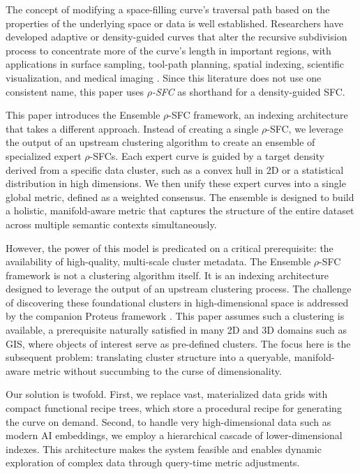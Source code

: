 \documentclass[11pt]{article}
\begin{document}
The concept of modifying a space-filling curve's traversal path based on the properties of the underlying space or data is well established. Researchers have developed adaptive or density-guided curves that alter the recursive subdivision process to concentrate more of the curve's length in important regions, with applications in surface sampling, tool-path planning, spatial indexing, scientific visualization, and medical imaging \cite{quinn2006adaptive,sun2015toolpath,tian2013density,zhou2021data,sakoglu2020space}. Since this literature does not use one consistent name, this paper uses \emph{$\rho$-SFC} as shorthand for a density-guided SFC.

This paper introduces the Ensemble $\rho$-SFC framework, an indexing architecture that takes a different approach. Instead of creating a single $\rho$-SFC, we leverage the output of an upstream clustering algorithm to create an ensemble of specialized expert $\rho$-SFCs. Each expert curve is guided by a target density derived from a specific data cluster, such as a convex hull in 2D or a statistical distribution in high dimensions. We then unify these expert curves into a single global metric, defined as a weighted consensus. The ensemble is designed to build a holistic, manifold-aware metric that captures the structure of the entire dataset across multiple semantic contexts simultaneously.

However, the power of this model is predicated on a critical prerequisite: the availability of high-quality, multi-scale cluster metadata. The Ensemble $\rho$-SFC framework is not a clustering algorithm itself. It is an indexing architecture designed to leverage the output of an upstream clustering process. The challenge of discovering these foundational clusters in high-dimensional space is addressed by the companion Proteus framework \cite{wollang2025proteus}. This paper assumes such a clustering is available, a prerequisite naturally satisfied in many 2D and 3D domains such as GIS, where objects of interest serve as pre-defined clusters. The focus here is the subsequent problem: translating cluster structure into a queryable, manifold-aware metric without succumbing to the curse of dimensionality.

Our solution is twofold. First, we replace vast, materialized data grids with compact functional recipe trees, which store a procedural recipe for generating the curve on demand. Second, to handle very high-dimensional data such as modern AI embeddings, we employ a hierarchical cascade of lower-dimensional indexes. This architecture makes the system feasible and enables dynamic exploration of complex data through query-time metric adjustments.
\end{document}
